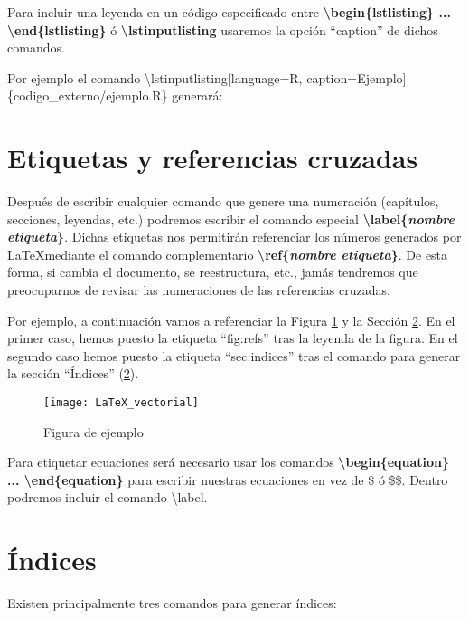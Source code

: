 Para incluir una leyenda en un código especificado entre \textbf{\textbackslash begin\{lstlisting\} ... \textbackslash end\{lstlisting\}} ó \textbf{\textbackslash lstinputlisting} usaremos la opción ``caption'' de dichos comandos.

Por ejemplo el comando \textbackslash lstinputlisting[language=R, caption=Ejemplo] \{codigo\_externo/ejemplo.R\} generará:



\section{Etiquetas y referencias cruzadas}

Después de escribir cualquier comando que genere una numeración (capítulos, secciones, leyendas, etc.) podremos escribir el comando especial \textbf{\textbackslash label\{\emph{nombre etiqueta}\}}. Dichas etiquetas nos permitirán referenciar los números generados por \LaTeX mediante el comando complementario \textbf{\textbackslash ref\{\emph{nombre etiqueta}\}}. De esta forma, si cambia el documento, se reestructura, etc., jamás tendremos que preocuparnos de revisar las numeraciones de las referencias cruzadas.

Por ejemplo, a continuación vamos a referenciar la Figura \ref{fig:refs} y la Sección \ref{sec:indices}. En el primer caso, hemos puesto la etiqueta ``fig:refs'' tras la leyenda de la figura. En el segundo caso hemos puesto la etiqueta ``sec:indices'' tras el comando para generar la sección ``Índices'' (\ref{sec:indices}).

\begin{figure}[h]
	\centering
	\texttt{[image: LaTeX\_vectorial]}
	\caption{Figura de ejemplo}	
	\label{fig:refs}
\end{figure}

Para etiquetar ecuaciones será necesario usar los comandos \textbf{\textbackslash begin\{equation\} ... \textbackslash end\{equation\}} para escribir nuestras ecuaciones en vez de \$ ó \$\$. Dentro podremos incluir el comando \textbackslash label.

\section{Índices}
\label{sec:indices}

Existen principalmente tres comandos para generar índices:


